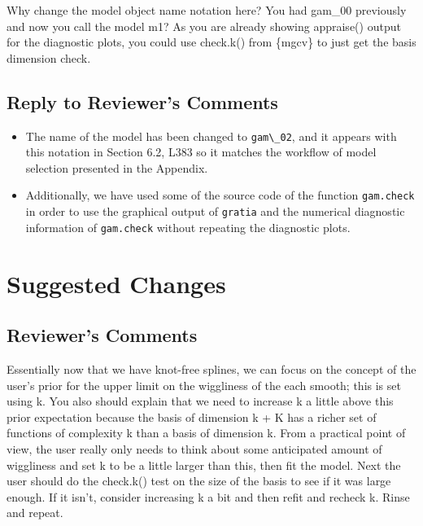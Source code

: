\documentclass[
]{article}
\newcommand{\passthrough}[1]{#1}
\providecommand{\tightlist}{%
  \setlength{\itemsep}{0pt}\setlength{\parskip}{0pt}}
\begin{document}
Why change the model object name notation here? You had gam\_00 previously and now you call the model m1? As you are already showing appraise() output for the diagnostic plots, you could use check.k() from \{mgcv\} to just get the basis dimension check.

\hypertarget{section-11}{%
\subsection{\texorpdfstring{\textcolor{reviewersblue} {Reply to Reviewer's Comments}}{}}\label{section-11}}

\begin{itemize}
\tightlist
\item
  The name of the model has been changed to \passthrough{\lstinline!gam\_02!}, and it appears with this notation in Section 6.2, L383 so it matches the workflow of model selection presented in the Appendix.
\item
  Additionally, we have used some of the source code of the function \passthrough{\lstinline!gam.check!} in order to use the graphical output of \passthrough{\lstinline!gratia!} and the numerical diagnostic information of \passthrough{\lstinline!gam.check!} without repeating the diagnostic plots.
\end{itemize}

\hypertarget{suggested-changes}{%
\section{Suggested Changes}\label{suggested-changes}}

\hypertarget{reviewers-comments-11}{%
\subsection{Reviewer's Comments}\label{reviewers-comments-11}}

Essentially now that we have knot-free splines, we can focus on the concept of the user's prior for the upper limit on the wiggliness of the each smooth; this is set using k. You also should explain that we need to increase k a little above this prior expectation because the basis of dimension k + K has a richer set of functions of complexity k than a basis of dimension k. From a practical point of view, the user really only needs to think about some anticipated amount of wiggliness and set k to be a little larger than this, then fit the model.
Next the user should do the check.k() test on the size of the basis to see if it was large enough. If it isn't, consider increasing k a bit and then refit and recheck k. Rinse and repeat.
\end{document}
